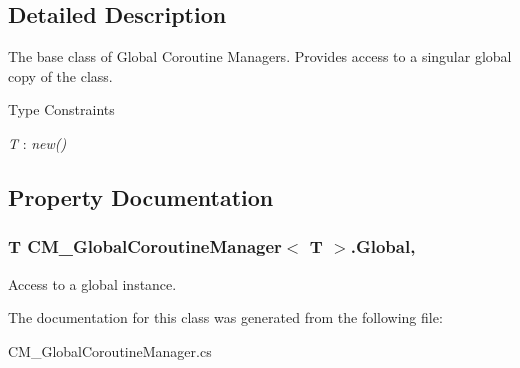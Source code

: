 \subsection{Detailed Description}
The base class of Global Coroutine Managers. Provides access to a singular global copy of the class. 

\begin{Desc}
\item[Type Constraints]\begin{description}
\item[{\em T} : {\em new()}]\end{description}
\end{Desc}


\subsection{Property Documentation}
\hypertarget{class_c_m___global_coroutine_manager_ad6d1dbbb92d1de12b8e1018cf62d3a31}{}
\subsubsection[{Global}]{\setlength{\rightskip}{0pt plus 5cm}T {\bf C\+M\+\_\+\+Global\+Coroutine\+Manager}$<$ T $>$.Global\hspace{0.3cm}{\ttfamily [static]}, {\ttfamily [get]}}\label{class_c_m___global_coroutine_manager_ad6d1dbbb92d1de12b8e1018cf62d3a31}


Access to a global instance. 



The documentation for this class was generated from the following file\+:\begin{DoxyCompactItemize}
\item 
C\+M\+\_\+\+Global\+Coroutine\+Manager.\+cs\end{DoxyCompactItemize}
